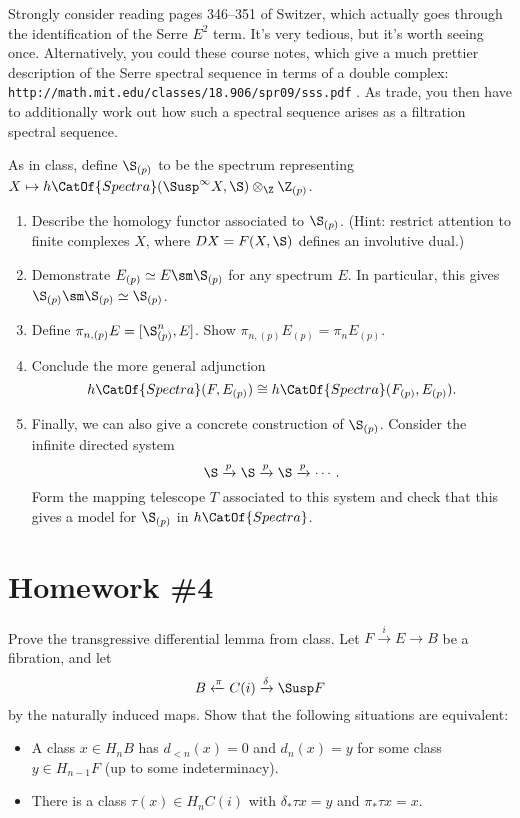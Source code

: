 \begin{task}
Strongly consider reading pages 346--351 of Switzer, which actually goes through the identification of the Serre $E^2$ term.  It's very tedious, but it's worth seeing once.  Alternatively, you could these course notes, which give a much prettier description of the Serre spectral sequence in terms of a double complex: \texttt{http://math.mit.edu/classes/18.906/spr09/sss.pdf} .  As trade, you then have to additionally work out how such a spectral sequence arises as a filtration spectral sequence.
\end{task}

\begin{problem}
As in class, define $\S_{(p)}$ to be the spectrum representing $X \mapsto h\CatOf{Spectra}(\Susp^\infty X, \S) \otimes_{\Z} \Z_{(p)}$.
\begin{enumerate}
    \item Describe the homology functor associated to $\S_{(p)}$.  (Hint: restrict attention to finite complexes $X$, where $DX = F(X, \S)$ defines an involutive dual.)
    \item Demonstrate $E_{(p)} \simeq E \sm \S_{(p)}$ for any spectrum $E$.  In particular, this gives $\S_{(p)} \sm \S_{(p)} \simeq \S_{(p)}$.
    \item Define $\pi_{n,(p)} E = [\S^n_{(p)}, E]$.  Show $\pi_{n,(p)} E_{(p)} = \pi_n E_{(p)}$.
    \item Conclude the more general adjunction \[h\CatOf{Spectra}(F, E_{(p)}) \cong h\CatOf{Spectra}(F_{(p)}, E_{(p)}).\]
    \item Finally, we can also give a concrete construction of $\S_{(p)}$.  Consider the infinite directed system \[\S \xrightarrow p \S \xrightarrow p \S \xrightarrow p \cdots.\]  Form the mapping telescope $T$ associated to this system and check that this gives a model for $\S_{(p)}$ in $h\CatOf{Spectra}$.
\end{enumerate}
\end{problem}




\section{Homework \#4}

\begin{problem}
Prove the transgressive differential lemma from class.  Let $F \xrightarrow{i} E \to B$ be a fibration, and let \[B \xleftarrow{\pi} C(i) \xrightarrow{\delta} \Susp F\] by the naturally induced maps.  Show that the following situations are equivalent:
\begin{itemize}
    \item A class $x \in H_n B$ has $d_{< n}(x) = 0$ and $d_n(x) = y$ for some class $y \in H_{n-1} F$ (up to some indeterminacy).
    \item There is a class $\tau(x) \in H_n C(i)$ with $\delta_* \tau x = y$ and $\pi_* \tau x = x$.
\end{itemize}
\end{problem}

